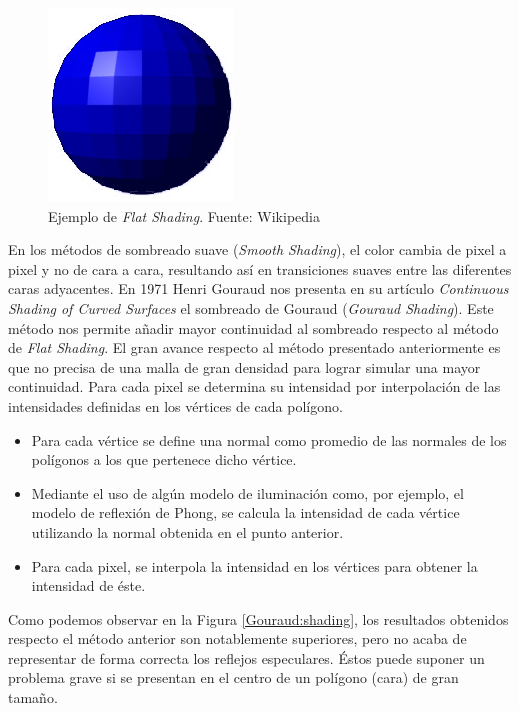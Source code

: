 \documentclass[titlepage,12pt]{report}
\begin{document}
\begin{figure}[ht]
	\centering
	\includegraphics[scale=0.5]{media/Flat-shading-sample.png}
	\caption{Ejemplo de \textit{Flat Shading}. Fuente: Wikipedia}
	\label{flat:shading}
\end{figure}

En los métodos de sombreado suave (\textit{Smooth Shading}), el color cambia de pixel a pixel y no de cara a cara, resultando así en transiciones suaves entre las diferentes caras adyacentes.
En 1971 Henri Gouraud nos presenta en su artículo \textit{Continuous Shading of Curved Surfaces} \citep{Henri1971} el sombreado de Gouraud (\textit{Gouraud Shading}). Este método nos permite añadir mayor continuidad al sombreado respecto al método de \textit{Flat Shading}. El gran avance respecto al método presentado anteriormente es que no precisa de una malla de gran densidad para lograr simular una mayor continuidad. Para cada pixel se determina su intensidad por interpolación de las intensidades definidas en los vértices de cada polígono.

\begin{itemize}
	\item Para cada vértice se define una normal como promedio de las normales de los polígonos a los que pertenece dicho vértice.
	\item Mediante el uso de algún modelo de iluminación como, por ejemplo, el modelo de reflexión de Phong, se calcula la intensidad de cada vértice utilizando la normal obtenida en el punto anterior.
	\item Para cada pixel, se interpola la intensidad en los vértices para obtener la intensidad de éste.
\end{itemize} 

Como podemos observar en la Figura \ref{Gouraud:shading}, los resultados obtenidos respecto el método anterior son notablemente superiores, pero no acaba de representar de forma correcta los reflejos especulares. Éstos puede suponer un problema grave si se presentan en el centro de un polígono (cara) de gran tamaño.
\end{document}
